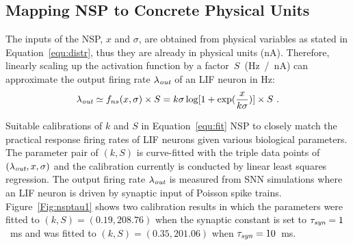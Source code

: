 	\subsection{Mapping NSP to Concrete Physical Units}
	\label{sec:af_model}
	The inputs of the NSP, $x$ and $\sigma$, are obtained from physical variables as stated in Equation~\ref{equ:distr}, thus they are already in physical units (nA).
	Therefore, linearly scaling up the activation function by a factor~$S$~(Hz~/~nA) can approximate the output firing rate $\lambda_{\textit{\textrm{out}}}$ of an LIF neuron in Hz:
	\begin{equation}
	\lambda_{\textit{\textrm{out}}} \simeq f_{ns}(x, \sigma) \times S = k \sigma \log [1 + \exp(\frac{x}{k \sigma})] \times S~.
	\label{equ:fit}
	\end{equation}	

	
	Suitable calibrations of $k$ and $S$ in Equation~\ref{equ:fit} \DIFdelbegin {}\DIFdelend \DIFaddbegin {}\DIFaddend NSP to closely match the practical response firing rates of LIF neurons given various biological parameters.
	The parameter pair of $(k, S)$ is curve-fitted with the triple data points of $(\lambda_{\textit{\textrm{out}}}, x, \sigma)$ and the calibration currently is conducted by linear least squares regression.
	The output firing rate $\lambda_{\textit{\textrm{out}}}$ is measured from SNN simulations where an LIF neuron is driven by synaptic input \DIFdelbegin {}\DIFdelend \DIFaddbegin {}\DIFaddend of Poisson spike trains.
	Figure~\ref{Fig:nsptau1} shows two calibration results in which the parameters were fitted to $(k, S)=(0.19,208.76)$ when the synaptic constant is set to $\tau_{\textit{\textrm{syn}}}=1$~ms and was fitted to $(k, S)=(0.35,201.06)$ when $\tau_{\textit{\textrm{syn}}}=10$~ms.

